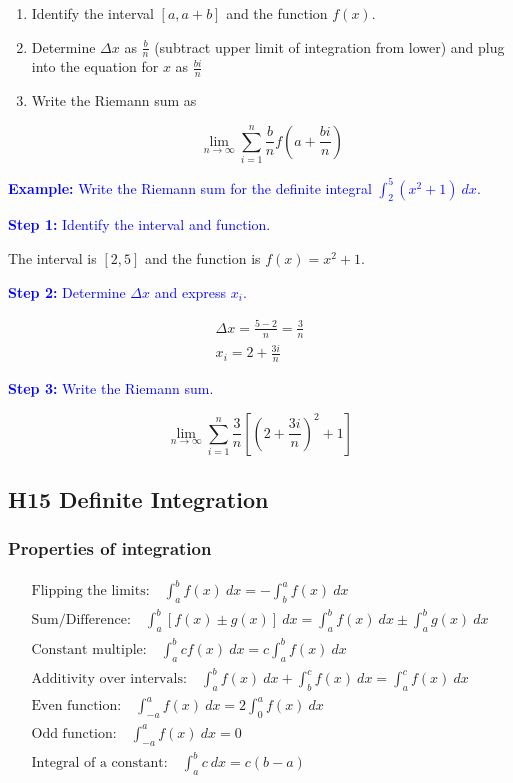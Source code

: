 \documentclass[letterpaper, 12pt]{article}
\newcommand{\example}[1]{\textcolor{blue}{\textbf{Example:} #1}}
\newcommand{\step}[2]{\textcolor{blue}{\textbf{Step #1:} #2}}
\begin{document}
\begin{enumerate}
\item Identify the interval $[a, a+b]$ and the function $f(x)$.
\item Determine $\Delta x$ as $\frac{b}{n}$ (subtract upper limit of integration from lower) and plug into the equation for $x$ as $\frac{bi}{n}$
\item Write the Riemann sum as

$$\lim_{n \to \infty} \sum_{i=1}^{n} \frac{b}{n} f\left(a + \frac{bi}{n}\right)$$

\end{enumerate}

\example{Write the Riemann sum for the definite integral $\displaystyle \int_{2}^{5} (x^2 + 1) \: dx$.}

\step{1}{Identify the interval and function.}

The interval is $[2, 5]$ and the function is $f(x) = x^2 + 1$.

\step{2}{Determine $\Delta x$ and express $x_i$.}

\begin{gather*}
\Delta x = \frac{5 - 2}{n} = \frac{3}{n} \\
x_i = 2 + \frac{3i}{n}
\end{gather*}

\step{3}{Write the Riemann sum.}

$$\boxed{\lim_{n \to \infty} \sum_{i=1}^{n} \frac{3}{n} \left[ \left(2 + \frac{3i}{n}\right)^2 + 1 \right]}$$

\subsection*{H15 Definite Integration}

\subsubsection*{Properties of integration}

\begin{gather*}
\text{Flipping the limits:} \quad \int_{a}^{b} f(x) \: dx = -\int_{b}^{a} f(x) \: dx \\
\text{Sum/Difference:} \quad \int_{a}^{b} [f(x) \pm g(x)] \: dx = \int_{a}^{b} f(x) \: dx \pm \int_{a}^{b} g(x) \: dx \\
\text{Constant multiple:} \quad \int_{a}^{b} c f(x) \: dx = c \int_{a}^{b} f(x) \: dx \\
\text{Additivity over intervals:} \quad \int_{a}^{b} f(x) \: dx + \int_{b}^{c} f(x) \: dx = \int_{a}^{c} f(x) \: dx \\
\text{Even function:} \quad \int_{-a}^{a} f(x) \: dx = 2 \int_{0}^{a} f(x) \: dx \\
\text{Odd function:} \quad \int_{-a}^{a} f(x) \: dx = 0 \\
\text{Integral of a constant:} \quad \int_{a}^{b} c \: dx = c(b - a)
\end{gather*}
\end{document}

